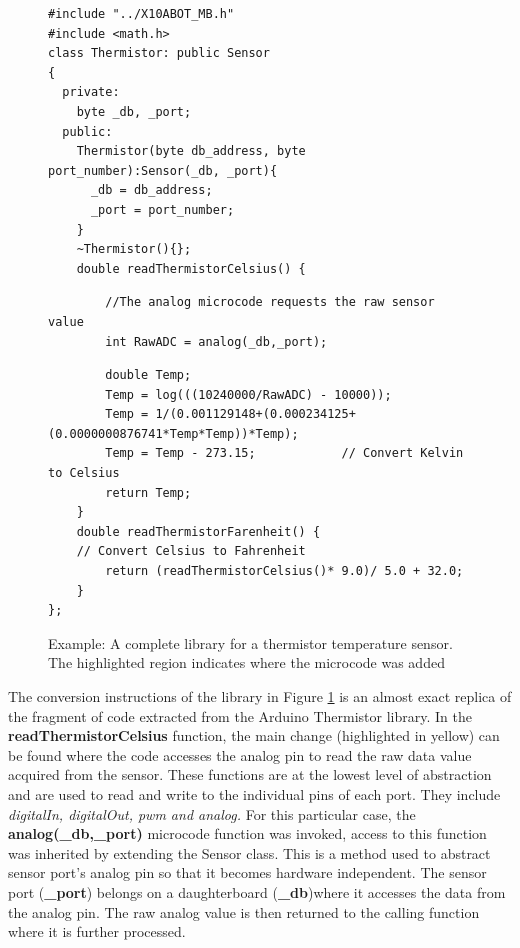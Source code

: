 \begin{figure}
		\footnotesize
        {\fontsize{8}{6}\selectfont
		
		\begin{verbatim}
#include "../X10ABOT_MB.h"
#include <math.h>
class Thermistor: public Sensor
{
  private:
    byte _db, _port;
  public:
    Thermistor(byte db_address, byte port_number):Sensor(_db, _port){
      _db = db_address;
      _port = port_number;
    }
    ~Thermistor(){};
    double readThermistorCelsius() {
    \end{verbatim}
    \begin{verbatim}
        //The analog microcode requests the raw sensor value
        int RawADC = analog(_db,_port); 
    \end{verbatim}
    \begin{verbatim}
        double Temp;
        Temp = log(((10240000/RawADC) - 10000));
        Temp = 1/(0.001129148+(0.000234125+(0.0000000876741*Temp*Temp))*Temp);
        Temp = Temp - 273.15;            // Convert Kelvin to Celsius
        return Temp;
    }
    double readThermistorFarenheit() {
    // Convert Celsius to Fahrenheit
        return (readThermistorCelsius()* 9.0)/ 5.0 + 32.0;
    }
};
	\end{verbatim}
		}
    \caption{Example: A complete library for a thermistor temperature sensor. The highlighted region indicates where the \xten microcode was added} \label{code:therm}
\end{figure}

The conversion instructions of the \xten library in Figure \ref{code:therm} is an almost exact replica of the fragment of code extracted from the Arduino Thermistor library. In the \textbf{readThermistorCelsius} function, the main change (highlighted in yellow) can be found where the code accesses the analog pin to read the raw data value acquired from the sensor. These functions are at the lowest level of abstraction and are used to read and write to the individual pins of each port. They include \emph{digitalIn, digitalOut, pwm and analog.} For this particular case, the \textbf{analog(\_db,\_port)} microcode function was invoked, access to this function was inherited by extending the Sensor class. This is a method used to abstract sensor port's analog pin so that it becomes hardware independent. The sensor port (\textbf{\_port}) belongs on a daughterboard (\textbf{\_db})where it accesses the data from the  analog pin. The raw analog value is then returned to the calling function where it is further processed.

